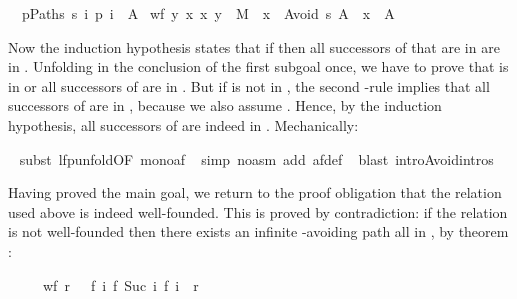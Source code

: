 \begin{isabellebody}
\begin{isamarkuptxt}
\begin{isabelle}
\ {}{\isachardot}\ {\isasymforall}p{\isasymin}Paths\ s{\isachardot}\ {\isasymexists}i{\isachardot}\ p\ i\ {\isasymin}\ A\ {\isasymLongrightarrow}\isanewline
{}wf\ {\isacharbraceleft}{\isacharparenleft}y{\isacharcomma}\ x{\isacharparenright}{\isachardot}\ {\isacharparenleft}x{\isacharcomma}\ y{\isacharparenright}\ {\isasymin}\ M\ {\isasymand}\ x\ {\isasymin}\ Avoid\ s\ A\ {\isasymand}\ x\ {\isasymnotin}\ A{\isacharbraceright}%
\end{isabelle}
Now the induction hypothesis states that if 
then all successors of  that are in  are in
. Unfolding  in the conclusion of the first
subgoal once, we have to prove that  is in  or all successors
of  are in .  But if  is not in ,
the second 
-rule implies that all successors of  are in
, because we also assume .
Hence, by the induction hypothesis, all successors of  are indeed in
. Mechanically:%
\end{isamarkuptxt}%
\ \isamarkuptrue%
subst\ lfp{\isacharunderscore}unfold{\isacharbrackleft}OF\ mono{\isacharunderscore}af{\isacharbrackright}{\isacharparenright}\isanewline
\ \isamarkupfalse%
simp\ {\isacharparenleft}no{\isacharunderscore}asm{\isacharparenright}\ add{\isacharcolon}\ af{\isacharunderscore}def{\isacharparenright}\isanewline
\ \isamarkupfalse%
blast\ intro{\isacharcolon}Avoid{\isachardot}intros{\isacharparenright}\isamarkupfalse%
%
\begin{isamarkuptxt}%
Having proved the main goal, we return to the proof obligation that the 
relation used above is indeed well-founded. This is proved by contradiction: if
the relation is not well-founded then there exists an infinite -avoiding path all in , by theorem
:
\begin{isabelle}%
\ \ \ \ \ wf\ r\ {\isacharequal}\ {\isacharparenleft}{\isasymnot}\ {\isacharparenleft}{\isasymexists}f{\isachardot}\ {\isasymforall}i{\isachardot}\ {\isacharparenleft}f\ {\isacharparenleft}Suc\ i{\isacharparenright}{\isacharcomma}\ f\ i{\isacharparenright}\ {\isasymin}\ r{\isacharparenright}{\isacharparenright}%

\end{isabelle}
\end{isamarkuptxt}
\end{isabellebody}
